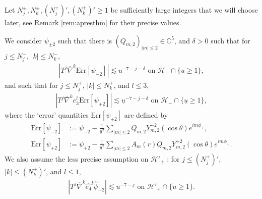 \documentclass[reqno]{amsart}
\numberwithin{equation}{section}
\newcommand{\mch}{\mathcal{H}}
\newcommand{\app}{‘}
\newcommand{\ubar}{{\underline{u}}}
\newcommand{\errp}{\mathrm{Err}[\Psip]}
\newcommand{\errm}{\mathrm{Err}[\Psim]}
\newcommand{\nablabar}{\overline{\nabla}}
\newcommand{\psihat}{\widehat{\psi}}
\newcommand{\eqhat}{\widehat{e_4}}
\newcommand{\Psip}{\psi_{+2}}
\newcommand{\psip}{\psi_{+2}}
\newcommand{\Psim}{\psi_{-2}}
\newcommand{\psim}{\psi_{-2}}
\newcommand{\psihatp}{\psihat_{+2}}
\newcommand{\sfrak}{2}
\newcommand{\ansatzm}{\frac{1}{\ubar^7}\sum_{|m|\leq2}Q_{m,\sfrak}Y_{m,\sfrak}^{-\sfrak}(\cos\theta)e^{im\phi_{+}}}
\newcommand{\ansatzp}{\frac{1}{\ubar^{7}}\sum_{|m|\leq2}A_m(r)Q_{m,\sfrak}Y_{m,\sfrak}^{+\sfrak}(\cos\theta)e^{im\phi_{+}}}
\theoremstyle{plain}
\theoremstyle{definition}
\theoremstyle{remark}
\numberwithin{equation}{section}
\begin{document}
Let $N_j^\pm, N_k^\pm, (N_j^+)', (N_k^+)'\geq 1$ be sufficiently large integers that we will choose later, see Remark \ref{rem:apresthm} for their precise values. 

We consider $\psi_{\pm 2}$ such that there is $(Q_{m,2})_{|m|\leq 2}\in\mathbb{C}^5$, and $\delta>0$ such that for $j\leq N_j^-$, $|k|\leq N_k^-$, 
    \begin{align}
        \left|T^j\nablabar^k\errm\right|\lesssim\ubar^{-7-j-\delta}\text{   on   }\mch_+\cap\{\ubar\geq 1\},\label{eqn:hypm}
    \end{align}
    and such that for $j\leq N_j^+$, $|k|\leq N_k^+$, and $l\leq 3$, 
    \begin{align}   \left|T^j\nablabar^ke_3^l\errp\right|\lesssim\ubar^{-7-j-\delta}\text{   on   }\mch_+\cap\{\ubar\geq 1\}\label{eqn:hypp},
    \end{align}
where the \app error' quantities $\mathrm{Err}[\psi_{\pm 2}]$ are defined by
\begin{align*}
    \errm&:=\psim-\ansatzm,\\
    \errp&:=\psip-\ansatzp.
\end{align*}
We also assume the less precise assumption on $\mch'_+$ : for $j\leq (N_j^+)'$, $|k|\leq (N_k^+)'$, and $l\leq 1$,
\begin{align}\label{eqn:hypp'}
    |T^j\nablabar^k\eqhat^{l}\psihatp|\lesssim u^{-7-j}\text{   on   }\mch'_+\cap\{u\geq 1\}.
\end{align}
\end{document}
